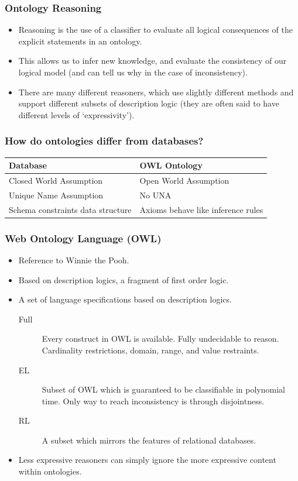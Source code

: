 \documentclass[aspectratio=169]{beamer} %
\begin{document}
\begin{frame}
\frametitle{Ontology Reasoning}

\begin{itemize}
  \item Reasoning is the use of a classifier to evaluate all logical consequences
  of the explicit statements in an ontology.
  \item This allows us to infer new knowledge, and evaluate the consistency of our
  logical model (and can tell us why in the case of inconsistency).
  \item There are many different reasoners, which use slightly different methods
  and support different subsets of description logic (they are often said to have
  different levels of ‘expressivity’).
\end{itemize}
\end{frame}

\begin{frame}
\frametitle{How do ontologies differ from databases?}

 \begin{table}[ht]
    \centering
    \begin{tabular}{|l|l|}
      \hline
      Database & OWL Ontology \\
      \hline
      Closed World Assumption & Open World Assumption \\
      Unique Name Assumption & No UNA \\
      Schema constraints data structure %
               & Axioms behave like inference rules\\\hline
    \end{tabular}
\end{table}
\end{frame}

\begin{frame}
\frametitle{Web Ontology Language (OWL)}

\begin{itemize}
  \item Reference to Winnie the Pooh.
  \item Based on description logics, a fragment of first order logic.
  \item A set of language specifications based on description logics.
  \begin{description}
    \item[Full] Every construct in OWL is available. Fully undecidable to
    reason. Cardinality restrictions, domain, range, and value restraints.
    \item[EL] Subset of OWL which is guaranteed to be classifiable in polynomial
    time. Only way to reach inconsistency is through disjointness.
    \item[RL] A subset which mirrors the features of relational databases.
  \end{description}
  \item Less expressive reasoners can simply ignore the more expressive content
  within ontologies.
\end{itemize}
\end{frame}
\end{document}

